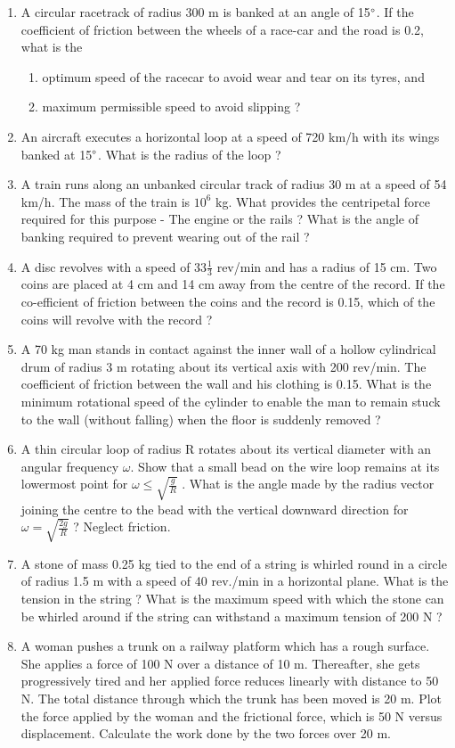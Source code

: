 \begin{enumerate}[label=\arabic*.,ref=\thesubsection.\theenumi]
\item A circular racetrack of radius 300 m is banked at an angle of 15$\degree$. If the coefficient of friction between the wheels of a race-car and the road is 0.2, what is the 
\begin{enumerate}
\item  optimum speed of the racecar to avoid wear and tear on its tyres, and 
\item  maximum permissible speed to avoid slipping ?
\end{enumerate}
\item An aircraft executes a horizontal loop at a speed of 720 km/h with its wings banked at 15$\degree$. What is the radius of the loop ?
\item A train runs along an unbanked circular track of radius 30 m at a speed of 54 km/h. The mass of the train is $10^6$
kg. What provides the centripetal force required for this
purpose - The engine or the rails ? What is the angle of banking required to prevent wearing out of the rail ?
\item A disc revolves with a speed of $33 \frac{1}{ 3}$ rev/min 
 and has a radius of 15 cm. Two coins are
placed at 4 cm and 14 cm away from the centre of the record. If the co-efficient of friction between the coins and the record is 0.15, which of the coins will revolve with the record ?
\item A 70 kg man stands in contact against the inner wall of a hollow cylindrical drum of radius 3 m rotating about its vertical axis with 200 rev/min. The coefficient of friction between the wall and his clothing is 0.15. What is the minimum rotational speed of the cylinder to enable the man to remain stuck to the wall (without falling) when the floor is suddenly removed ?
\item A thin circular loop of radius R rotates about its vertical diameter with an angular frequency $\omega$. Show that a small bead on the wire loop remains at its lowermost point for $\omega \le \sqrt{\frac{g}{R}}$ . What is the angle made by the radius vector joining the centre to the bead with the vertical downward direction for $\omega = \sqrt{\frac{2g}{R}}$  ? Neglect friction.
\item A stone of mass 0.25 kg tied to the end of a string is whirled round in a circle of radius 1.5 m with a speed of 40 rev./min in a horizontal plane. What is the tension in the string ? What is the maximum speed with which the stone can be whirled around if the string can withstand a maximum tension of 200 N ?
\item A woman pushes a trunk on a railway platform which has a rough surface. She applies a force of 100 N over a distance of 10 m. Thereafter, she gets progressively tired and her applied force reduces linearly with distance to 50 N. The total distance through which the trunk has been moved is 20 m. Plot the force applied by the woman and the frictional force, which is 50 N versus displacement. Calculate the work done by the two forces over 20 m.

\end{enumerate}

